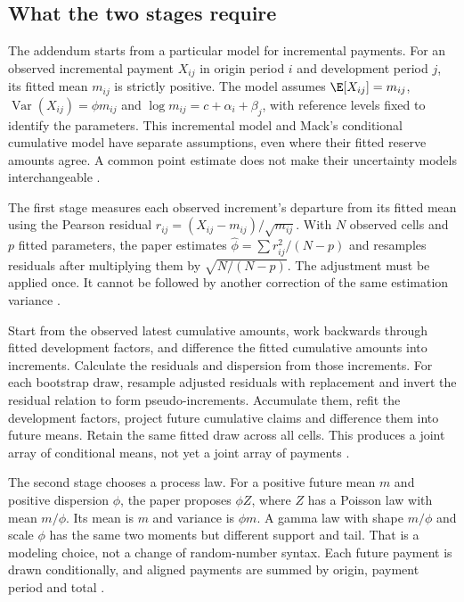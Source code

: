 \subsection{What the two stages require}

The addendum starts from a particular model for incremental payments.
For an observed incremental payment $X_{ij}$ in origin period $i$
and development period $j$, its fitted mean $m_{ij}$ is strictly positive.
The model assumes $\E[X_{ij}]=m_{ij}$,
$\operatorname{Var}(X_{ij})=\phi m_{ij}$ and
$\log m_{ij}=c+\alpha_i+\beta_j$, with reference levels fixed to identify
the parameters. This incremental model and Mack's conditional cumulative
model have separate assumptions, even where their fitted reserve amounts
agree. A common point estimate does not make their uncertainty models
interchangeable \citep[equations 2.1--2.3]{england2001addendum}.

The first stage measures each observed increment's departure from its fitted
mean using the Pearson residual $r_{ij}=(X_{ij}-m_{ij})/\sqrt{m_{ij}}$.
With $N$ observed cells and $p$ fitted parameters, the paper estimates
$\widehat\phi=\sum r_{ij}^2/(N-p)$ and resamples residuals after multiplying
them by $\sqrt{N/(N-p)}$. The adjustment must be applied once. It cannot
be followed by another correction of the same estimation variance
\citep[equations 2.4--2.6 and 3.1]{england2001addendum}.

Start from the observed latest cumulative amounts, work backwards through
fitted development factors, and difference the fitted cumulative amounts
into increments. Calculate the residuals and dispersion from those increments.
For each bootstrap draw, resample adjusted residuals with replacement and
invert the residual relation to form pseudo-increments. Accumulate them,
refit the development factors, project future cumulative claims and difference
them into future means. Retain the same fitted draw across all cells. This
produces a joint array of conditional means, not yet a joint array of payments
\citep[Section 2 and Appendix A, Triangles 1--9]{england2001addendum}.

The second stage chooses a process law. For a positive future mean $m$
and positive dispersion $\phi$, the paper proposes $\phi Z$, where $Z$
has a Poisson law with mean $m/\phi$. Its mean is $m$ and variance is
$\phi m$. A gamma law with shape $m/\phi$ and scale $\phi$ has the
same two moments but different support and tail. That is a modeling choice,
not a change of random-number syntax. Each future payment is drawn
conditionally, and aligned payments are summed by origin, payment period
and total \citep[Section 3 and Appendix A, Triangles 9--10]{england2001addendum}.

